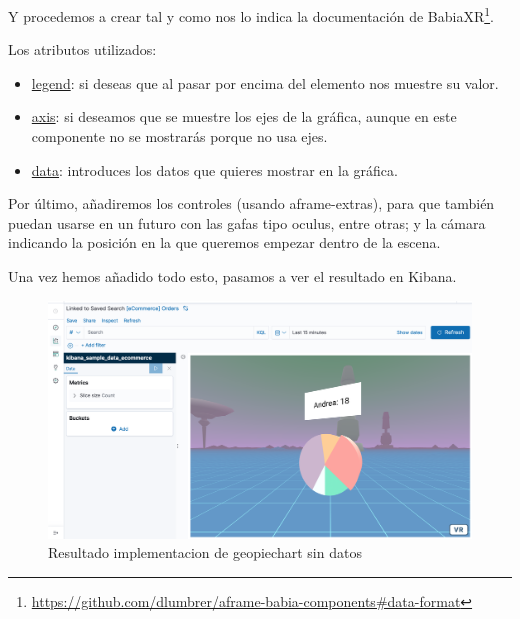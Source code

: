 \documentclass[a4paper, 12pt]{book}
\begin{document}


Y procedemos a crear tal y como nos lo indica la documentación de BabiaXR\footnote{\url{https://github.com/dlumbrer/aframe-babia-components#data-format}}.



Los atributos utilizados:
\begin{itemize}
    \item \underline{legend}: si deseas que al pasar por encima del elemento nos muestre su valor.
    \item \underline{axis}: si deseamos que se muestre los ejes de la gráfica, aunque en este componente no se mostrarás porque no usa ejes.
    \item \underline{data}: introduces los datos que quieres mostrar en la gráfica.
\end{itemize}

Por último, añadiremos los controles (usando aframe-extras), para que también puedan usarse en un futuro con las gafas tipo oculus, entre otras; y la cámara indicando la posición en la que queremos empezar dentro de la escena.



Una vez hemos añadido todo esto, pasamos a ver el resultado en Kibana.

\begin{figure}[H]
  \centering
  \includegraphics[width=12cm, keepaspectratio]{img/development/pie-sin-data.png}
  \caption{Resultado implementacion de geopiechart sin datos}
  \label{fig:piesindata}
\end{figure}



\end{document}
